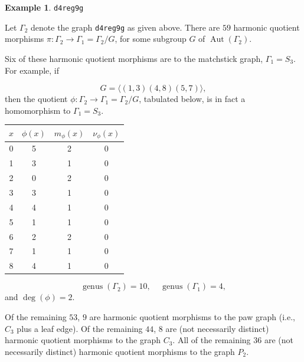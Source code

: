 \documentclass[12pt,letterpaper]{article}
\theoremstyle{definition}
\newtheorem{example}[theorem]{Example}
\DeclareMathOperator{\Aut}{Aut}
\DeclareMathOperator{\genus}{genus}
\begin{document}
\begin{example}%
\label{example:d4reg9g}
 {\tt d4reg9g}\newline
{\rm  
  Let $\Gamma_2$ denote the graph {\tt d4reg9g} as given above.
There are $59$ harmonic quotient morphisms
$\pi: \Gamma_2\to \Gamma_1=\Gamma_2/G$,
for some subgroup $G$ of $\Aut(\Gamma_2)$.

Six of these harmonic quotient morphisms are to the matchstick graph,
$\Gamma_1=S_3$.
For example, if 

\[
G = \langle (1,3)(4,8)(5,7) \rangle,
\]
then the quotient $\phi: \Gamma_2\to \Gamma_1=\Gamma_2/G$,
tabulated below, is in fact a homomorphism to $\Gamma_1=S_3$.

\begin{center}
\begin{tabular}{c|c|c|c}  
  $x$ & $\phi(x)$ & $m_\phi(x)$ & $\nu_\phi(x)$ \\ \hline
  0   &    5   &        2         &  0   \\ 
  1   &    3   &        1         &  0  \\ 
  2   &    0   &        2         &  0  \\ 
  3   &    3   &        1         &  0  \\ 
  4   &    4   &        1         &  0   \\
  5   &    1   &        1         &  0   \\
  6   &    2   &        2         &  0   \\
  7   &    1   &        1         &  0   \\
  8   &    4   &        1         &  0   \\ 
\end{tabular}
\end{center}

\[
  \genus(\Gamma_2) =10,\ \ \ \ \
  \genus(\Gamma_1) =4,
\]
and $\deg(\phi)=2$.

Of the remaining $53$, $9$ are harmonic quotient morphisms to
the paw graph (i.e., $C_3$ plus a leaf edge).
Of the remaining $44$, $8$ are (not necessarily distinct) harmonic
quotient morphisms to the graph $C_3$.
All of the remaining $36$ are (not necessarily distinct) harmonic
quotient morphisms to the graph $P_2$.

}
\end{example}
\end{document}
